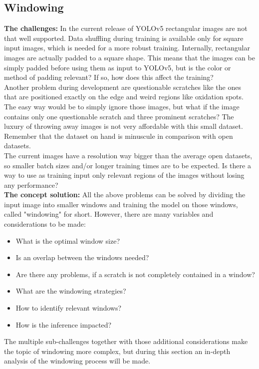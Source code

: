 \subsection{Windowing}
\label{subsection:windowing}

\textbf{The challenges:} In the current release of YOLOv5 rectangular images are not that well supported. Data shuffling during training is available only for square input images, which is needed for a more robust training. Internally, rectangular images are actually padded to a square shape. This means that the images can be simply padded before using them as input to YOLOv5, but is the color or method of padding relevant? If so, how does this affect the training? \\
Another problem during development are questionable scratches like the ones that are positioned exactly on the edge and weird regions like oxidation spots. The easy way would be to simply ignore those images, but what if the image contains only one questionable scratch and three prominent scratches? The luxury of throwing away images is not very affordable with this small dataset. Remember that the dataset on hand is minuscule in comparison with open datasets. \\


The current images have a resolution way bigger than the average open datasets, so smaller batch sizes and/or longer training times are to be expected. Is there a way to use as training input only relevant regions of the images without losing any performance?\\

\textbf{The concept solution:} All the above problems can be solved by dividing the input image into smaller windows and training the model on those windows, called "windowing" for short.  However, there are many variables and considerations to be made:
\begin{itemize}
\item What is the optimal window size?
\item Is an overlap between the windows needed?
\item Are there any problems, if a scratch is not completely contained in a window?
\item What are the windowing strategies?
\item How to identify relevant windows?
\item How is the inference impacted?
\end{itemize}
The multiple sub-challenges together with those additional considerations make the topic of windowing more complex, but during this section an in-depth analysis of the windowing process will be made.

